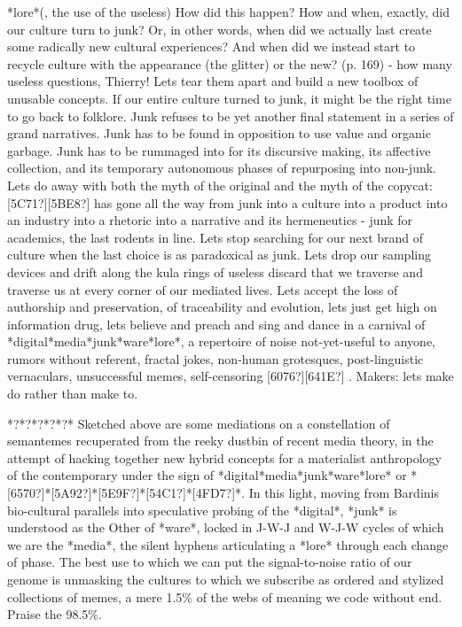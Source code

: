*lore*\newline
[65E0?][7528?][4E4B?][7528?] (, the
use of the useless)\newline
{\textquotedbl}How did this happen? How and when, exactly, did our
culture turn to junk? Or, in other words, when did we actually last
create some radically new cultural experiences? And when did we instead
start to recycle culture with the appearance (the glitter) or the
new?{\textquotedbl} (p. 169) - how many useless questions, Thierry!
Let{\textquotesingle}s tear them apart and build a new toolbox of
unusable concepts. If our entire culture turned to junk, it might be
the right time to go back to folklore. Junk refuses to be yet another
final statement in a series of grand narratives. Junk has to be found
in opposition to use value and organic garbage. Junk has to be rummaged
into for its discursive making, its affective collection, and its
temporary autonomous phases of repurposing into non-junk.
Let{\textquotesingle}s do away with both the myth of the original and
the myth of the copycat: [5C71?][5BE8?] 
has gone all the way from junk into a culture into a product into an
industry into a rhetoric into a narrative and its hermeneutics - junk
for academics, the last rodents in line. Let{\textquotesingle}s stop
searching for our next brand of culture when the last choice is as
paradoxical as junk. Let{\textquotesingle}s drop our sampling devices
and drift along the kula rings of useless discard that we traverse and
traverse us at every corner of our mediated lives.
Let{\textquotesingle}s accept the loss of authorship and preservation,
of traceability and evolution, let{\textquotesingle}s just get high on
information drug, let{\textquotesingle}s believe and preach and sing
and dance in a carnival of *digital*media*junk*ware*lore*, a repertoire
of noise not-yet-useful to anyone, rumors without referent, fractal
jokes, non-human grotesques, post-linguistic vernaculars, unsuccessful
memes, self-censoring [6076?][641E?] . Makers:
let{\textquotesingle}s {\textquotedbl}make do{\textquotedbl} rather
than {\textquotedbl}make to{\textquotedbl}.

*?*?*?*?*?*\newline
Sketched above are some mediations on a constellation of semantemes
recuperated from the reeky dustbin of recent media theory, in the
attempt of hacking together new hybrid concepts for a materialist
anthropology of the contemporary under the sign of
*digital*media*junk*ware*lore* or
*[6570?]*[5A92?]*[5E9F?]*[54C1?]*[4FD7?]*. In this light, moving from
Bardini{\textquotesingle}s bio-cultural parallels into speculative
probing of the *digital*, *junk* is understood as the Other of *ware*,
locked in J-W-J and W-J-W cycles of which we are the *media*, the
silent hyphens articulating a *lore* through each change of phase. The
best use to which we can put the signal-to-noise ratio of our genome is
unmasking the cultures to which we subscribe as ordered and stylized
collections of memes, a mere 1.5\% of the webs of meaning we code
without end. Praise the 98.5\%.

